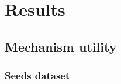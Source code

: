 \chapter{Results} \label{appendix:results}

\section{Mechanism utility} \label{appendix:results-mechanism-utility}
\subsection{Seeds dataset} \label{appendix:results-mechanism-utility-seeds-dataset}
